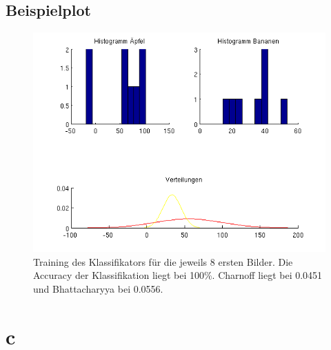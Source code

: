 \documentclass[a4paper,10pt]{article}
\begin{document}
\subsection{Beispielplot}


\begin{figure}[htbp]
  \centering
    \includegraphics[width=1\linewidth]{plot.png}
  
  \caption{Training des Klassifikators für die jeweils 8 ersten Bilder. Die Accuracy der Klassifikation liegt bei 100\%. Charnoff liegt bei 0.0451 und Bhattacharyya bei 0.0556.}
\end{figure}
\newpage
\section{c}
\end{document}

